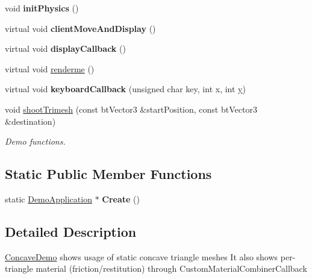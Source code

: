 \begin{DoxyCompactItemize}
\item 
\hypertarget{class_concave_demo_a895b39fc88a7a9ab960cd6c4ab803f8b}{void {\bfseries init\+Physics} ()}\label{class_concave_demo_a895b39fc88a7a9ab960cd6c4ab803f8b}

\item 
\hypertarget{class_concave_demo_a6b0f05cc6b73ee95ec71ccd4ed8edd7a}{virtual void {\bfseries client\+Move\+And\+Display} ()}\label{class_concave_demo_a6b0f05cc6b73ee95ec71ccd4ed8edd7a}

\item 
\hypertarget{class_concave_demo_a283a298132aef92b27afdc57e153f8be}{virtual void {\bfseries display\+Callback} ()}\label{class_concave_demo_a283a298132aef92b27afdc57e153f8be}

\item 
virtual void \hyperlink{class_concave_demo_afeaaf033de2719c21168613ed536f109}{renderme} ()
\item 
\hypertarget{class_concave_demo_a7ee72a6ac4f2b9d3767c5d52c025242f}{virtual void {\bfseries keyboard\+Callback} (unsigned char key, int x, int \hyperlink{_ice_utils_8h_aa7ffaed69623192258fb8679569ff9ba}{y})}\label{class_concave_demo_a7ee72a6ac4f2b9d3767c5d52c025242f}

\item 
\hypertarget{class_concave_demo_ae14c3ed72c82d9cf3a83d35c97a11064}{void \hyperlink{class_concave_demo_ae14c3ed72c82d9cf3a83d35c97a11064}{shoot\+Trimesh} (const bt\+Vector3 \&start\+Position, const bt\+Vector3 \&destination)}\label{class_concave_demo_ae14c3ed72c82d9cf3a83d35c97a11064}

\begin{DoxyCompactList}\small\item\em Demo functions. \end{DoxyCompactList}\end{DoxyCompactItemize}
\subsection*{Static Public Member Functions}
\begin{DoxyCompactItemize}
\item 
\hypertarget{class_concave_demo_ace2a3672587013a2f72eaf6a89936fb7}{static \hyperlink{class_demo_application}{Demo\+Application} $\ast$ {\bfseries Create} ()}\label{class_concave_demo_ace2a3672587013a2f72eaf6a89936fb7}

\end{DoxyCompactItemize}


\subsection{Detailed Description}
\hyperlink{class_concave_demo}{Concave\+Demo} shows usage of static concave triangle meshes It also shows per-\/triangle material (friction/restitution) through Custom\+Material\+Combiner\+Callback 

